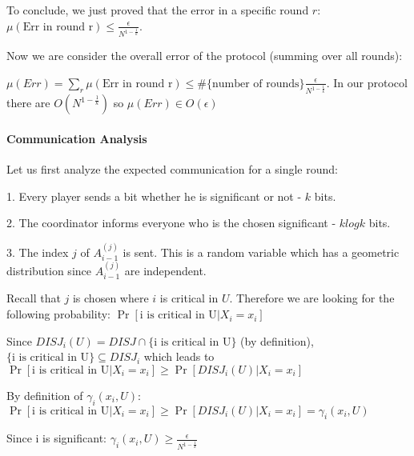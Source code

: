 \documentclass{article}
\theoremstyle{plain}
\begin{document}
To conclude, we just proved that the error in a specific round $r$:
$\mu(\text{Err in round r}) \leq \frac{\epsilon}{N^{1-\frac{1}{k}}}$.\newline

Now we are consider the overall error of the protocol (summing over all rounds):

$\mu(Err) = \sum_{r} \mu(\text{Err in round r}) \leq \#\{\text{number of rounds}\} \frac{\epsilon}{N^{1-\frac{1}{k}}}$. \newline
In our protocol there are $O(N^{1-\frac{1}{k}})$ so
$\mu(Err) \in O(\epsilon)$

\paragraph{Communication Analysis}
Let us first analyze the expected communication for a single round: \newline

1. Every player sends a bit whether he is significant or not - $k$ bits.\newline

2. The coordinator informs everyone who is the chosen significant - $klogk$ bits. \newline

3. The index $j$ of $A_{i-1}^{(j)}$ is sent. \newline
This is a random variable which has a geometric distribution since $A_{i-1}^{(j)}$ are independent. \newline

Recall that $j$ is chosen where $i$ is critical in $U$. \newline
Therefore we are looking for the following probability:
$\Pr[\text{i is critical in U}| X_i = x_i]$ \newline

Since $DISJ_i(U) = DISJ \cap \{\text{i is critical in U}\}$ (by definition), $\{\text{i is critical in U}\} \subseteq DISJ_i$ which leads to \newline
$\Pr[\text{i is critical in U}| X_i = x_i] \geq \Pr[DISJ_i(U) | X_i = x_i]$ \newline

By definition of $\gamma_i(x_i, U)$: \newline
$\Pr[\text{i is critical in U}| X_i = x_i] \geq \Pr[DISJ_i(U) | X_i = x_i] = \gamma_i(x_i, U) $\newline

Since i is significant: \newline
$\gamma_i(x_i, U) \geq \frac{\epsilon}{N^{1-\frac{1}{k}}}$ \newline
\end{document}
